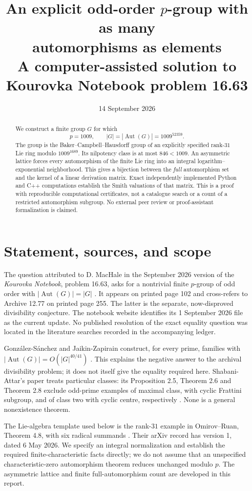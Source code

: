 \documentclass[11pt]{article}
\title{An explicit odd-order $p$-group with as many\\automorphisms as elements\\[5pt]
\large A computer-assisted solution to Kourovka Notebook problem 16.63}
\author{}
\date{14 September 2026}
\theoremstyle{definition}\newtheorem{definition}[theorem]{Definition}
\theoremstyle{remark}\newtheorem{remark}[theorem]{Remark}
\DeclareMathOperator{\Aut}{Aut}
\begin{document}
\maketitle
\begin{abstract}
We construct a finite group $G$ for which
\[
 p=1009,\qquad |G|=|\Aut(G)|=1009^{52359}.
\]
The group is the Baker--Campbell--Hausdorff group of an explicitly specified
rank-$31$ Lie ring modulo $1009^{1689}$. Its nilpotency class is at most $846<1009$.
An asymmetric lattice forces every automorphism of the finite Lie ring into an
integral logarithm--exponential neighborhood. This gives a bijection between the
\emph{full} automorphism set and the kernel of a linear derivation matrix.
Exact independently implemented Python and C++ computations establish the
Smith valuations of that matrix. This is a proof with reproducible computational
certificates, not a catalogue search or a count of a restricted automorphism
subgroup. No external peer review or proof-assistant formalization is claimed.
\end{abstract}
{\small\tableofcontents}

\section{Statement, sources, and scope}
The question attributed to D. MacHale in the September 2026 version of the
\emph{Kourovka Notebook}, problem 16.63, asks for a nontrivial finite $p$-group of
odd order with $|\Aut(G)|=|G|$ \cite{KN}. It appears on printed page 102 and
cross-refers to Archive 12.77 on printed page 255. The latter is the separate,
now-disproved divisibility conjecture. The notebook website identifies its
1 September 2026 file as the current update. No published resolution of the
exact equality question was located in the literature searches recorded in the
accompanying ledger.

Gonz\'alez-S\'anchez and Jaikin-Zapirain construct, for every prime, families with
$|\Aut(G)|=O(|G|^{40/41})$ \cite{GSJ}. This explains the negative answer to the
archival divisibility problem; it does not itself give the equality required
here. Shabani-Attar's paper treats particular classes: its Proposition 2.5,
Theorem 2.6 and Theorem 2.8 exclude odd-prime examples of maximal class, with
cyclic Frattini subgroup, and of class two with cyclic centre, respectively
\cite{SA}. None is a general nonexistence theorem.

The Lie-algebra template used below is the rank-$31$ example in
Omirov--Ruan, Theorem 4.8, with six radical summands \cite{OR}. Their arXiv
record has version 1, dated 6 May 2026. We specify an integral normalization
and establish the required finite-characteristic facts directly; we do not
assume that an unspecified characteristic-zero automorphism theorem reduces
unchanged modulo $p$. The asymmetric lattice and finite full-automorphism
count are developed in this report.
\end{document}
